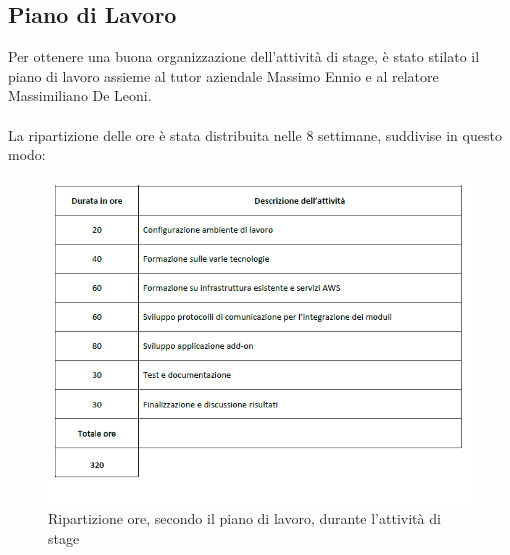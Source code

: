 \subsection{Piano di Lavoro}
Per ottenere una buona organizzazione dell'attività di stage, è stato stilato il piano di lavoro assieme al tutor aziendale Massimo Ennio e al relatore Massimiliano De Leoni.
\\\\La ripartizione delle ore è stata distribuita nelle 8 settimane, suddivise in questo modo:
\begin{figure}[!h] 
	\centering 
	\includegraphics[scale = 0.8]{immagini/ripartizione-ore-piano.png} 
	\caption{Ripartizione ore, secondo il piano di lavoro, durante l'attività di stage}
\end{figure}

